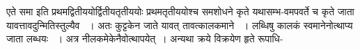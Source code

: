 \documentclass[11pt, openany]{book}
\begin{document}
\begin{sloppypar}
\noindent एते समा इति प्रथमद्वितीययोर्द्वितीयतृतीययोः प्रथमतृतीययोश्च समशोधने कृते यथासम्भ-वमपवर्ते च कृते जाता यावत्तावदुन्मितिस्तुल्यैव ~। अतः कुट्टकेन जाते यावत् तावत्कालकमाने ~। लब्धिषु कालकं स्वमानेनोत्थाप्य जाता लब्धयः ~। अत्र नीलकमेकेनैवोत्थापयेत्~। अन्यथा क्रये विक्रयेण हृते रूपाधि-
\end{sloppypar}

\newpage
\end{document}

